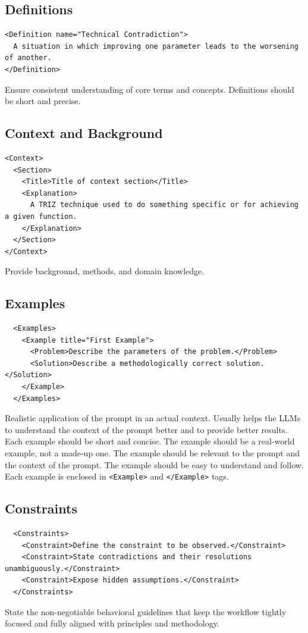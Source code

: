 \documentclass[a4paper,11pt]{refart}
\begin{document}
\subsection{Definitions}
\begin{lstlisting}
<Definition name="Technical Contradiction">
  A situation in which improving one parameter leads to the worsening of another.
</Definition>
\end{lstlisting}
Ensure consistent understanding of core terms and concepts. Definitions should be short and precise.

\subsection{Context and Background}
\begin{lstlisting}
<Context>
  <Section>
    <Title>Title of context section</Title>
    <Explanation>
      A TRIZ technique used to do something specific or for achieving a given function.
    </Explanation>
  </Section>
</Context>
\end{lstlisting}
Provide background, methods, and domain knowledge.

\subsection{Examples}
\begin{lstlisting}
  <Examples>
    <Example title="First Example">
      <Problem>Describe the parameters of the problem.</Problem>
      <Solution>Describe a methodologically correct solution.</Solution>
    </Example>
  </Examples>
\end{lstlisting}
Realistic application of the prompt in an actual context. Usually helps the LLMs to understand the context of the prompt better and to provide better results. Each example should be short and concise. The example should be a real-world example, not a made-up one. The example should be relevant to the prompt and the context of the prompt. The example should be easy to understand and follow. Each example is enclosed in \lstinline!<Example>! and \lstinline!</Example>! tags.

\subsection{Constraints}
\begin{lstlisting}
  <Constraints>
    <Constraint>Define the constraint to be observed.</Constraint>
    <Constraint>State contradictions and their resolutions unambiguously.</Constraint>
    <Constraint>Expose hidden assumptions.</Constraint>
  </Constraints>
\end{lstlisting}
State the non-negotiable behavioral guidelines that keep the workflow tightly focused and fully aligned with principles and methodology.
\end{document}
